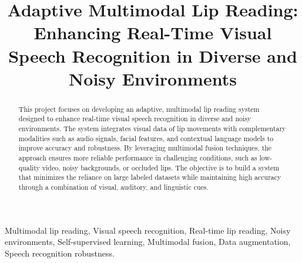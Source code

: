 \documentclass[conference]{IEEEtran}
\begin{document}
\title{Adaptive Multimodal Lip Reading: Enhancing Real-Time Visual Speech Recognition in Diverse and Noisy Environments
}

\author{



\and
{}
} \maketitle

\begin{abstract} This project focuses on developing an adaptive, multimodal lip reading system designed to enhance real-time visual speech recognition in diverse and noisy environments. The system integrates visual data of lip movements with complementary modalities such as audio signals, facial features, and contextual language models to improve accuracy and robustness. By leveraging multimodal fusion techniques, the approach ensures more reliable performance in challenging conditions, such as low-quality video, noisy backgrounds, or occluded lips. The objective is to build a system that minimizes the reliance on large labeled datasets while maintaining high accuracy through a combination of visual, auditory, and linguistic cues.

 \end{abstract}
 \begin{IEEEkeywords}Multimodal lip reading, Visual speech recognition, Real-time lip reading, Noisy environments, Self-supervised learning, Multimodal fusion, Data augmentation, Speech recognition robustness.
 \end{IEEEkeywords}
\end{document}
